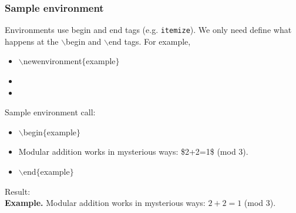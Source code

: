 \begin{frame}  \frametitle{Sample environment}
Environments use begin and end tags (e.g. \texttt{itemize}). We only need define what happens at the {\color{command}$\backslash$begin} and {\color{command}$\backslash$end} tags. For example,
\begin{itemize}
\item[] {\color{command}$\backslash$newenvironment\color{braces}$\{${\color{black}example}$\}$}
\item[] 
\item[] 
\end{itemize}
Sample environment call:
\begin{itemize}
\item[] {\color{command}$\backslash$begin\color{braces}$\{${\color{black}example}$\}$}
\item[] Modular addition works in mysterious ways: {\color{braces}\$}2+2=1{\color{braces}\$} (mod 3).
\item[] {\color{command}$\backslash$end\color{braces}$\{${\color{black}example}$\}$}
\end{itemize}
Result:
\vspace{5mm} \\
\small\textbf{Example.}\hspace{1.5mm} Modular addition works in mysterious ways: $2+2 = 1$ (mod 3).
\end{frame}

